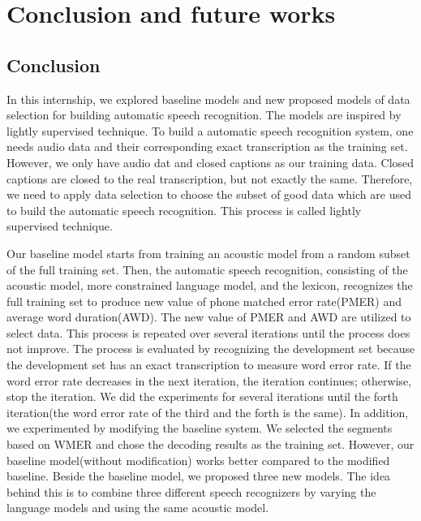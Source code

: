 \chapter{Conclusion and future works}

\section{Conclusion}
In this internship, we explored baseline models and new proposed models of data selection for building automatic speech recognition. The models are inspired by lightly supervised technique. To build a automatic speech recognition system, one needs audio data and their corresponding exact transcription as the training set. However, we only have audio dat and closed captions as our training data. Closed captions are closed to the real transcription, but not exactly the same. Therefore, we need to apply data selection to choose the subset of good data which are used to build the automatic speech recognition. This process is called  lightly supervised technique.

Our baseline model starts from training an acoustic model from a random subset of the full training set. Then, the automatic speech recognition, consisting of the acoustic model, more constrained language model, and the lexicon, recognizes the full training set to produce new value of phone matched error rate(PMER) and average word duration(AWD). The new value of PMER and AWD are utilized to select data. This process is repeated over several iterations until the process does not improve. The process is evaluated by recognizing the development set because the development set has an exact transcription to measure word error rate. If the word error rate decreases in the next iteration, the iteration continues; otherwise, stop the iteration. We did the experiments for several iterations until the forth iteration(the word error rate of the third and the forth is the same). In addition, we experimented by modifying the baseline system. We selected the segments based on WMER and chose the decoding results as the training set. However, our baseline model(without modification) works better compared to the modified baseline. Beside the baseline model, we proposed three new models. The idea behind this is to combine three different speech recognizers by varying the language models and using the same acoustic model. 

